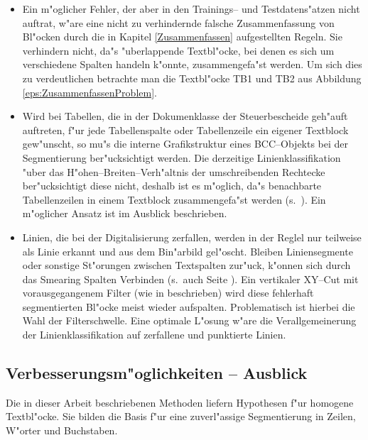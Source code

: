 \begin{itemize}
   \item Ein m"oglicher Fehler, der aber in den Trainings-- und Testdatens"atzen nicht auftrat, 
   w"are eine nicht zu verhindernde falsche Zusammenfassung von Bl"ocken durch die in Kapitel
   \ref{Zusammenfassen} aufgestellten Regeln. Sie verhindern nicht, da"s "uberlappende Textbl"ocke,
   bei denen es sich um verschiedene Spalten handeln k"onnte, zusammengefa"st werden.
   Um sich dies zu verdeutlichen betrachte man die Textbl"ocke TB1 und TB2 aus 
   Abbildung \ref{eps:ZusammenfassenProblem}.
     
  \item Wird bei Tabellen, die in der Dokumenklasse der Steuerbescheide geh"auft 
  auftreten, f"ur jede Tabellenspalte oder Tabellenzeile ein eigener Textblock gew"unscht, so
  mu"s die interne Grafikstruktur eines BCC--Objekts bei der Segmentierung ber"ucksichtigt werden.
  Die derzeitige Linienklassifikation "uber das H"ohen--Breiten--Verh"altnis der umschreibenden
  Rechtecke ber"ucksichtigt diese nicht, deshalb ist es m"oglich, da"s benachbarte
  Tabellenzeilen in einem Textblock zusammengefa"st werden (s.\ ). 
  Ein m"oglicher Ansatz ist im Ausblick  beschrieben.
  

  \item Linien, die bei der Digitalisierung zerfallen, werden in der Reglel nur teilweise 
  als Linie erkannt und aus dem Bin"arbild gel"oscht. 
  Bleiben Liniensegmente oder sonstige St"orungen zwischen Textspalten zur"uck, 
  k"onnen sich durch das Smearing Spalten Verbinden (s.\ auch  Seite 
  \pageref{eps:HorizKleb}).
  Ein vertikaler XY--Cut mit vorausgegangenem Filter (wie in  beschrieben) 
  wird diese fehlerhaft segmentierten Bl"ocke meist wieder aufspalten. Problematisch ist
  hierbei die Wahl der Filterschwelle. Eine optimale L"osung w"are die Verallgemeinerung der
  Linienklassifikation auf zerfallene und punktierte Linien.

\end{itemize}

\subsection{Verbesserungsm"oglichkeiten -- Ausblick}\label{ZoningAusblick}
Die in dieser Arbeit beschriebenen Methoden liefern Hypothesen f"ur homogene Textbl"ocke. Sie
bilden die Basis f"ur eine zuverl"assige Segmentierung in Zeilen, W"orter und Buchstaben. 

